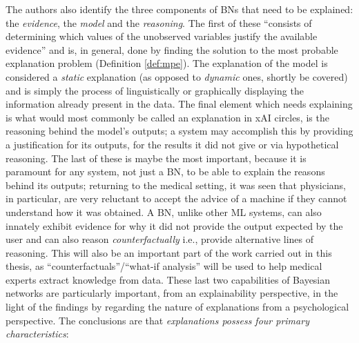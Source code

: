 The authors also identify the three components of BNs that need to be explained: the \textit{evidence}, the \textit{model} and the \textit{reasoning}.
The first of these \enquote{consists of determining which values of the unobserved variables justify the available evidence} and is, in general, done by finding the solution to the most probable explanation problem (Definition \ref{def:mpe}).
The explanation of the model is considered a \textit{static} explanation (as opposed to \textit{dynamic} ones, shortly be covered) and is simply the process of linguistically or graphically displaying the information already present in the data.
The final element which needs explaining is what would most commonly be called an explanation in xAI circles, is the reasoning behind the model's outputs; a system may accomplish this by providing a justification for its outputs, for the results it did not give or via hypothetical reasoning.
The last of these is maybe the most important, because it is paramount for any system, not just a BN, to be able to explain the reasons behind its outputs; returning to the medical setting, it was seen that physicians, in particular, are very reluctant to accept the advice of a machine if they cannot understand how it was obtained.
A BN, unlike other ML systems, can also innately exhibit evidence for why it did not provide the output expected by the user and can also reason \textit{counterfactually} i.e., provide alternative lines of reasoning.
This will also be an important part of the work carried out in this thesis, as \enquote{counterfactuals}/\enquote{what-if analysis} will be used to help medical experts extract knowledge from data. 
These last two capabilities of Bayesian networks are particularly important, from an explainability perspective, in the light of the findings by \citet{miller2018explanation} regarding the nature of explanations from a psychological perspective.
The conclusions are that \textit{explanations possess four primary characteristics}:
